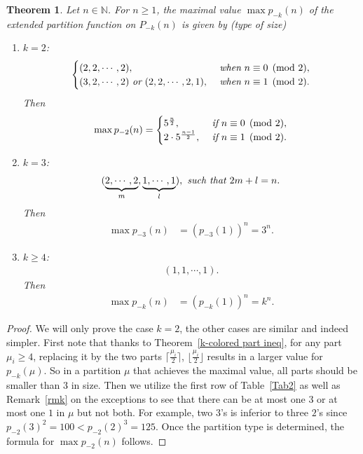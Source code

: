 \documentclass[12pt,reqno]{amsart}
\numberwithin{equation}{section}
\theoremstyle{plain}
\newtheorem{theorem}{Theorem}[section]
\theoremstyle{definition}
\begin{document}
\begin{theorem}\label{maximal theorem}
Let $n\in\mathbb{N}$. For $n\geq1$, the maximal value $\max p_{-k}(n)$ of the extended partition function on $P_{-k}(n)$ is given by (type of size)
\begin{enumerate}[1)]
\item $k=2$:
\begin{align*}
\begin{cases}
(2,2,\cdots,2),\ &\emph{when}~n\equiv0\pmod{2}, \cr (3,2,\cdots,2)~\emph{or}~(2,2,\cdots,2,1),\ &\emph{when}~n\equiv1\pmod{2}.
\end{cases}
\end{align*}
Then
\begin{align*}
\max p_{-2}(n)=
\begin{cases}
5^{\frac{n}{2}},\ &\emph{if}~n\equiv0\pmod{2}, \cr 2\cdot5^{\frac{n-1}{2}},\ &\emph{if}~n\equiv1\pmod{2}.
\end{cases}
\end{align*}

\item $k=3$:
\begin{align*}
(\underbrace{2,\cdots,2}_{m},\underbrace{1,\cdots,1}_{l}), \emph{ such that }2m+l=n.
\end{align*}
Then
\begin{align*}
\max p_{-3}(n) &=\left(p_{-3}(1)\right)^{n}=3^{n}.
\end{align*}

\item $k\geq 4$:
\begin{align*}
(1,1,\cdots,1).
\end{align*}
Then
\begin{align*}
\max p_{-k}(n) &=\left(p_{-k}(1)\right)^{n}=k^{n}.
\end{align*}
\end{enumerate}
\end{theorem}

\begin{proof}
We will only prove the case $k=2$, the other cases are similar and indeed simpler. First note that thanks to Theorem~\ref{k-colored part ineq}, for any part $\mu_i\geq 4$, replacing it by the two parts $\lceil\frac{\mu_{i}}{2}\rceil$, $\lfloor\frac{\mu_{i}}{2}\rfloor$ results in a larger value for $p_{-k}(\mu)$. So in a partition $\mu$ that achieves the maximal value, all parts should be smaller than $3$ in size. Then we utilize the first row of Table~\ref{Tab2} as well as Remark~\ref{rmk} on the exceptions to see that there can be at most one $3$ or at most one $1$ in $\mu$ but not both. For example, two $3$'s is inferior to three $2$'s since $p_{-2}(3)^2=100<p_{-2}(2)^3=125$. Once the partition type is determined, the formula for $\max p_{-2}(n)$ follows.
\end{proof}
\end{document}
